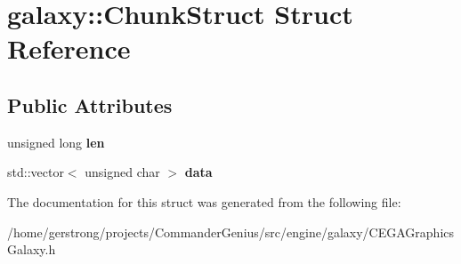 \hypertarget{structgalaxy_1_1_chunk_struct}{
\section{galaxy::ChunkStruct Struct Reference}
\label{structgalaxy_1_1_chunk_struct}
}
\subsection*{Public Attributes}
\begin{DoxyCompactItemize}
\item 
\hypertarget{structgalaxy_1_1_chunk_struct_a3107307b1b7eaedd5881273dac8116f3}{
unsigned long {\bfseries len}}
\label{structgalaxy_1_1_chunk_struct_a3107307b1b7eaedd5881273dac8116f3}

\item 
\hypertarget{structgalaxy_1_1_chunk_struct_a28f556cb7b2a29f27e3e8296df2720de}{
std::vector$<$ unsigned char $>$ {\bfseries data}}
\label{structgalaxy_1_1_chunk_struct_a28f556cb7b2a29f27e3e8296df2720de}

\end{DoxyCompactItemize}


The documentation for this struct was generated from the following file:\begin{DoxyCompactItemize}
\item 
/home/gerstrong/projects/CommanderGenius/src/engine/galaxy/CEGAGraphicsGalaxy.h\end{DoxyCompactItemize}
